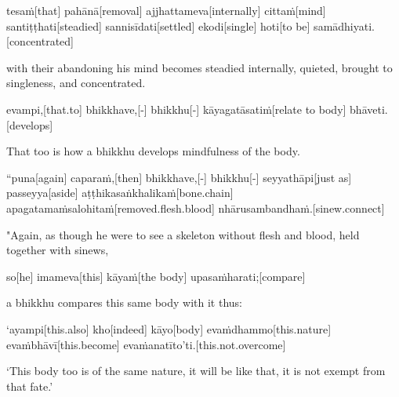 \begin{samepage}
\begingl[glneveryline={\PaliGlossA,\PaliGlossB}]
tesaṁ[that] pahānā[removal] ajjhattameva[internally] cittaṁ[mind] santiṭṭhati[steadied] sannisīdati[settled] ekodi[single] hoti[to be] samādhiyati.[concentrated]
\endgl
\nopagebreak
\linespread{0.5}
\begin{spacin}{0.2}
{\PaliGlossFT with their abandoning his mind becomes steadied internally, quieted, brought to singleness, and concentrated.}
\end{spacin}
\vskip 12pt
\end{samepage}
\begin{samepage}
\begingl[glneveryline={\PaliGlossA,\PaliGlossB}]
evampi,[that.to] bhikkhave,[-] bhikkhu[-] kāyagatāsatiṁ[relate to body] bhāveti.[develops]
\endgl
\nopagebreak
\linespread{0.5}
\begin{spacin}{0.2}
{\PaliGlossFT That too is how a bhikkhu develops mindfulness of the body.}
\end{spacin}
\vskip 12pt
\end{samepage}
\vskip 0.05in
\begin{samepage}
\begingl[glneveryline={\PaliGlossA,\PaliGlossB}]
“puna[again] caparaṁ,[then] bhikkhave,[-] bhikkhu[-] seyyathāpi[just as] passeyya[aside] aṭṭhikasaṅkhalikaṁ[bone.chain] apagatamaṁsalohitaṁ[removed.flesh.blood] nhārusambandhaṁ.[sinew.connect]
\endgl
\nopagebreak
\linespread{0.5}
\begin{spacin}{0.2}
{\PaliGlossFT "Again, as though he were to see a skeleton without flesh and blood, held together with sinews,}
\end{spacin}
\vskip 12pt
\end{samepage}
\begin{samepage}
\begingl[glneveryline={\PaliGlossA,\PaliGlossB}]
so[he] imameva[this] kāyaṁ[the body] upasaṁharati;[compare]
\endgl
\nopagebreak
\linespread{0.5}
\begin{spacin}{0.2}
{\PaliGlossFT a bhikkhu compares this same body with it thus:}
\end{spacin}
\vskip 12pt
\end{samepage}
\begin{samepage}
\begingl[glneveryline={\PaliGlossA,\PaliGlossB}]
‘ayampi[this.also] kho[indeed] kāyo[body] evaṁdhammo[this.nature] evaṁbhāvī[this.become] evaṁanatīto’ti.[this.not.overcome]
\endgl
\nopagebreak
\linespread{0.5}
\begin{spacin}{0.2}
{\PaliGlossFT ‘This body too is of the same nature, it will be like that, it is not exempt from that fate.’}
\end{spacin}
\vskip 12pt
\end{samepage}
